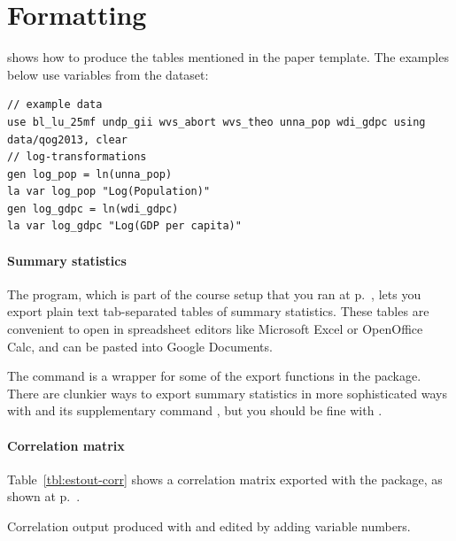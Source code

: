 %

\section{Formatting}

 shows how to produce the tables mentioned in the paper template. The examples below use variables from the \qog{} dataset:%

\begin{verbatim}
// example data
use bl_lu_25mf undp_gii wvs_abort wvs_theo unna_pop wdi_gdpc using data/qog2013, clear
// log-transformations
gen log_pop = ln(unna_pop)
la var log_pop "Log(Population)"
gen log_gdpc = ln(wdi_gdpc)
la var log_gdpc "Log(GDP per capita)"
\end{verbatim}

%
\paragraph{Summary statistics}%
  The  program, which is part of the course setup that you ran at p.~\pageref{sec:course-setup}, lets you export plain text tab-separated tables of summary statistics. These tables are convenient to open in spreadsheet editors like Microsoft Excel or OpenOffice Calc, and can be pasted into Google Documents.%

  The  command is a wrapper for some of the export functions in the  package. There are clunkier ways to export summary statistics in more sophisticated ways with  and its supplementary command , but you should be fine with .%

%
\paragraph{Correlation matrix}%
  Table~\ref{tbl:estout-corr} shows a correlation matrix exported with the  package, as shown at p.~\pageref{tbl:correlate_export}.%

\begin{fullwidth}
	\begin{table}
		\footnotesize
    
		\caption{Correlation output produced with  and edited by adding variable numbers.}
		\label{tbl:estout-corr}
	\end{table}
\end{fullwidth}


